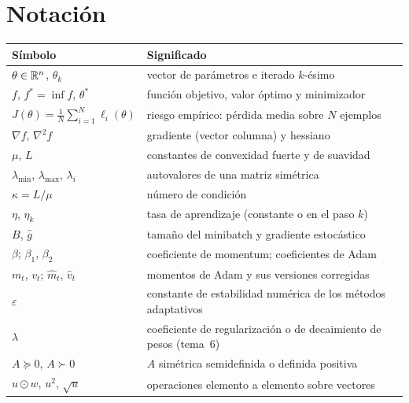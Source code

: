 \documentclass[11pt,a4paper,twoside,openany]{book}
\newcommand{\gb}{\hat g}
\begin{document}
\section*{Notación}
\begin{center}
\begin{tabular}{@{}ll@{}}
\toprule
Símbolo & Significado \\
\midrule
$\theta\in\mathbb{R}^{n}$, $\theta_k$ & vector de parámetros e iterado $k$-ésimo \\
$f$, $f^{\ast}=\inf f$, $\theta^{\ast}$ & función objetivo, valor óptimo y minimizador \\
$J(\theta)=\frac1N\sum_{i=1}^{N}\ell_i(\theta)$ & riesgo empírico: pérdida media sobre $N$ ejemplos \\
$\nabla f$, $\nabla^{2}f$ & gradiente (vector columna) y hessiano \\
$\mu$, $L$ & constantes de convexidad fuerte y de suavidad \\
$\lambda_{\min}$, $\lambda_{\max}$, $\lambda_i$ & autovalores de una matriz simétrica \\
$\kappa=L/\mu$ & número de condición \\
$\eta$, $\eta_k$ & tasa de aprendizaje (constante o en el paso $k$) \\
$B$, $\gb$ & tamaño del minibatch y gradiente estocástico \\
$\beta$; $\beta_1$, $\beta_2$ & coeficiente de momentum; coeficientes de Adam \\
$m_t$, $v_t$; $\hat m_t$, $\hat v_t$ & momentos de Adam y sus versiones corregidas \\
$\varepsilon$ & constante de estabilidad numérica de los métodos adaptativos \\
$\lambda$ & coeficiente de regularización o de decaimiento de pesos (tema~6) \\
$A\succeq 0$, $A\succ 0$ & $A$ simétrica semidefinida o definida positiva \\
$u\odot w$, $u^{2}$, $\sqrt{u}$ & operaciones elemento a elemento sobre vectores \\
\bottomrule
\end{tabular}
\end{center}

\tableofcontents

\mainmatter







\appendix


\backmatter

\end{document}
